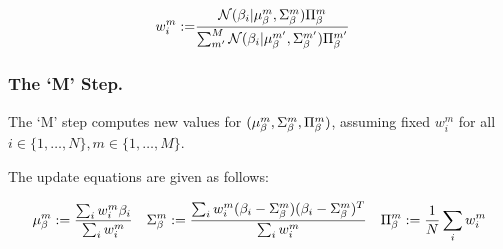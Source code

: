 \begin{align}
    w_{i}^{m} 
    :=& 
    \frac{
        \mathcal{N}(\beta_{i} | \mu_{\beta}^{m},\Sigma_{\beta}^{m})\Pi_{\beta}^{m}
    }
    {
        \sum_{m'}^{M}
        \mathcal{N}(\beta_{i} | \mu_{\beta}^{m'},\Sigma_{\beta}^{m'})\Pi_{\beta}^{m'}
    }
\end{align}



\subsubsection{The `M' Step.}
The `M' step computes new values for $(\mu_{\beta}^{m}, \Sigma_{\beta}^{m}, \Pi_{\beta}^{m})$, assuming fixed $w_{i}^{m}$ for all $i \in \{1,\dots,N\}, m \in \{1,\dots,M\}$.

The update equations are given as follows:



\begin{equation}
    \mu_{\beta}^{m} := 
    \frac{
        \sum_{i}w_{i}^{m}\beta_{i}
    }
    {
        \sum_{i}w_{i}^{m}
    }
    \quad
    \Sigma_{\beta}^{m} :=
    \frac{
        \sum_{i}w_{i}^{m}
        (\beta_{i} - \Sigma_{\beta}^{m})
        (\beta_{i} - \Sigma_{\beta}^{m})^{T}
    }
    {
        \sum_{i}w_{i}^{m}
    }
    \quad
    \Pi_{\beta}^{m} :=
    \frac{1}{N}\sum_{i}{w_{i}^{m}}
\end{equation}
